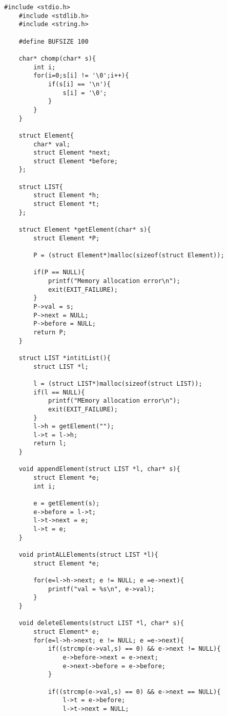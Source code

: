 \documentclass[fontsize = 10pt, paper= a4,twocolumn,column_gap=3zw]{jlreq}
\begin{document}
\begin{lstlisting}[basicstyle=\ttfamily\footnotesize, frame=single, caption=s2212022-3.c,label=s2212022-3.c]
    #include <stdio.h>
    #include <stdlib.h>
    #include <string.h>
    
    #define BUFSIZE 100
    
    char* chomp(char* s){
        int i;
        for(i=0;s[i] != '\0';i++){
            if(s[i] == '\n'){
                s[i] = '\0';
            }
        }
    }
    
    struct Element{
        char* val;
        struct Element *next;
        struct Element *before;
    };
    
    struct LIST{
        struct Element *h;
        struct Element *t;
    };
    
    struct Element *getElement(char* s){
        struct Element *P;
    
        P = (struct Element*)malloc(sizeof(struct Element));
    
        if(P == NULL){
            printf("Memory allocation error\n");
            exit(EXIT_FAILURE);
        }
        P->val = s;
        P->next = NULL;
        P->before = NULL;
        return P;
    }
    
    struct LIST *intitList(){
        struct LIST *l;
    
        l = (struct LIST*)malloc(sizeof(struct LIST));
        if(l == NULL){
            printf("MEmory allocation error\n");
            exit(EXIT_FAILURE);
        }
        l->h = getElement("");
        l->t = l->h;
        return l;
    }
    
    void appendElement(struct LIST *l, char* s){
        struct Element *e;
        int i;
    
        e = getElement(s);
        e->before = l->t;
        l->t->next = e;
        l->t = e;
    }
    
    void printALLElements(struct LIST *l){
        struct Element *e;
    
        for(e=l->h->next; e != NULL; e =e->next){
            printf("val = %s\n", e->val);
        }
    }
    
    void deleteElements(struct LIST *l, char* s){
        struct Element* e;
        for(e=l->h->next; e != NULL; e =e->next){
            if((strcmp(e->val,s) == 0) && e->next != NULL){
                e->before->next = e->next;
                e->next->before = e->before;
            }
    
            if((strcmp(e->val,s) == 0) && e->next == NULL){
                l->t = e->before;
                l->t->next = NULL;
                

\end{lstlisting}
\end{document}

